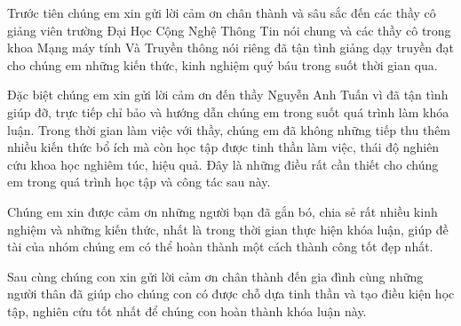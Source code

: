  
 
\begin{acknowledgements}      

	Trước tiên chúng em xin gửi lời cảm ơn chân thành và sâu sắc đến các thầy cô giảng viên trường Đại Học Cộng Nghệ Thông Tin nói chung và các thầy cô trong khoa Mạng máy tính Và Truyền thông nói riêng đã tận tình giảng dạy truyền đạt cho chúng em những kiến thức, kinh nghiệm quý báu trong suốt thời gian qua.

	Đặc biệt chúng em xin gửi lời cảm ơn đến thầy Nguyễn Anh Tuấn vì đã tận tình giúp đỡ, trực tiếp chỉ bảo và hướng dẫn chúng em trong suốt quá trình làm khóa luận. Trong thời gian làm việc với thầy, chúng em đã không những tiếp thu thêm nhiều kiến thức bổ ích mà còn học tập được tinh thần làm việc, thái độ nghiên cứu khoa học nghiêm túc, hiệu quả. Đây là những điều rất cần thiết cho chúng em trong quá trình học tập và công tác sau này.

	Chúng em xin được cảm ơn những người bạn đã gắn bó, chia sẻ rất nhiều kinh nghiệm và những kiến thức, nhất là trong thời gian thực hiện khóa luận, giúp đề tài của nhóm chúng em có thể hoàn thành một cách thành công tốt đẹp nhất.

	Sau cùng chúng con xin gửi lời cảm ơn chân thành đến gia đình cùng những người thân đã giúp cho chúng con có được chỗ dựa tinh thần và tạo điều kiện học tập, nghiên cứu tốt nhất để chúng con hoàn thành khóa luận này.

\end{acknowledgements}
  